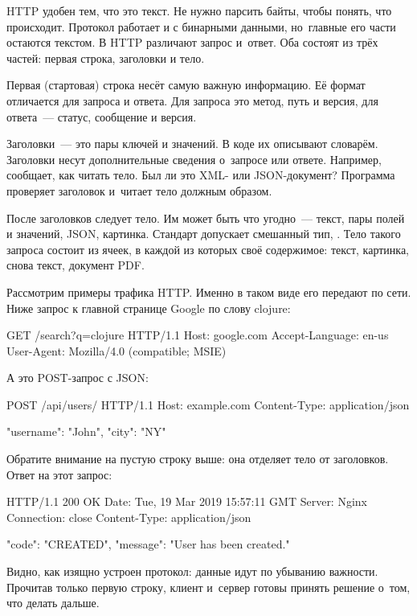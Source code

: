 HTTP удобен тем, что это текст. Не нужно парсить байты, чтобы понять, что
происходит. Протокол работает и с бинарными данными, но~главные его части
остаются текстом. В HTTP различают запрос и~ответ. Оба состоят из трёх частей:
первая строка, заголовки и тело.

Первая (стартовая) строка несёт самую важную информацию. Её формат отличается
для запроса и ответа. Для запроса это метод, путь и версия, для ответа~---
статус, сообщение и версия.


Заголовки~--- это пары ключей и значений. В коде их описывают словарём. Заголовки
несут дополнительные сведения о~запросе или ответе. Например,
 сообщает, как читать тело. Был ли это XML- или
JSON-документ? Программа проверяет заголовок и~читает тело должным образом.

После заголовков следует тело. Им может быть что угодно~--- текст, пары полей и
значений, JSON, картинка. Стандарт допускает смешанный тип,
. Тело такого запроса состоит из ячеек, в каждой из
которых своё содержимое: текст, картинка, снова текст, документ PDF.

Рассмотрим примеры трафика HTTP. Именно в таком виде его передают по сети. Ниже
запрос к главной странице Google по слову clojure:

\begin{http}
GET /search?q=clojure HTTP/1.1
Host: google.com
Accept-Language: en-us
User-Agent: Mozilla/4.0 (compatible; MSIE)
\end{http}

А это POST-запрос с JSON:

\pagebreaklarge

\begin{http}
POST /api/users/ HTTP/1.1
Host: example.com
Content-Type: application/json

{"username": "John", "city": "NY"}
\end{http}

Обратите внимание на пустую строку выше: она отделяет тело от заголовков. Ответ
на этот запрос:

\begin{http}
HTTP/1.1 200 OK
Date: Tue, 19 Mar 2019 15:57:11 GMT
Server: Nginx
Connection: close
Content-Type: application/json

{
  "code": "CREATED",
  "message": "User has been created."
}
\end{http}

Видно, как изящно устроен протокол: данные идут по убыванию важности. Прочитав
только первую строку, клиент и~сервер готовы принять решение о~том, что делать
дальше.

